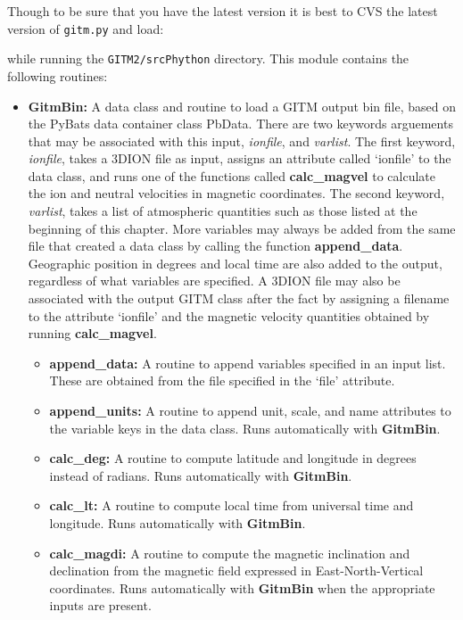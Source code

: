  
 \noindent Though to be sure that you have the latest version it is best to CVS the latest version of {\tt gitm.py} and load:
 
 
\noindent while running the {\tt GITM2/srcPhython} directory.  This module contains the following routines:

\begin{itemize}
\item[]{\bf GitmBin: } A data class and routine to load a GITM output bin file, based on the PyBats data container class PbData.  There are two keywords arguements that may be associated with this input, \textit{ionfile}, and \textit{varlist}.  The first keyword, \textit{ionfile}, takes a 3DION file as input, assigns an attribute called `ionfile' to the data class, and runs one of the functions called {\bf calc\_magvel} to calculate the ion and neutral velocities in magnetic coordinates.  The second keyword, \textit{varlist}, takes a list of atmospheric quantities such as those listed at the beginning of this chapter.  More variables may always be added from the same file that created a data class by calling the function {\bf append\_data}.  Geographic position in degrees and local time are also added to the output, regardless of what variables are specified.  A 3DION file may also be associated with the output GITM class after the fact by assigning a filename to the attribute `ionfile' and the magnetic velocity quantities obtained by running {\bf calc\_magvel}.
	\begin{itemize}
	\item[]{\bf append\_data: } A routine to append variables specified in an input list.  These are obtained from the file specified in the `file' attribute.
	\item[]{\bf append\_units: } A routine to append unit, scale, and name attributes to the variable keys in the data class.  Runs automatically with {\bf GitmBin}.
	\item[]{\bf calc\_deg: } A routine to compute latitude and longitude in degrees instead of radians.  Runs automatically with {\bf GitmBin}.
	\item[]{\bf calc\_lt: } A routine to compute local time from universal time and longitude.  Runs automatically with {\bf GitmBin}.
	\item[]{\bf calc\_magdi: } A routine to compute the magnetic inclination and declination from the magnetic field expressed in East-North-Vertical coordinates.  Runs automatically with {\bf GitmBin} when the appropriate inputs are present.

\end{itemize}
\end{itemize}
